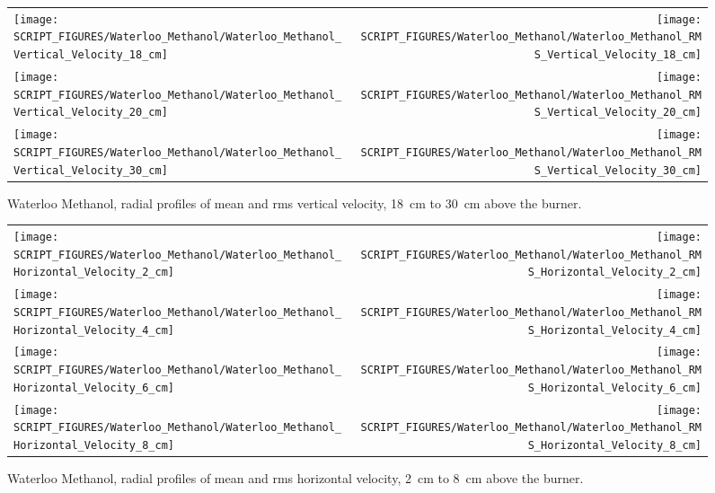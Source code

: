 \begin{figure}[p]
\begin{tabular*}{\textwidth}{l@{\extracolsep{\fill}}r}
\texttt{[image: SCRIPT\_FIGURES/Waterloo\_Methanol/Waterloo\_Methanol\_Vertical\_Velocity\_18\_cm]} &
\texttt{[image: SCRIPT\_FIGURES/Waterloo\_Methanol/Waterloo\_Methanol\_RMS\_Vertical\_Velocity\_18\_cm]} \\
\texttt{[image: SCRIPT\_FIGURES/Waterloo\_Methanol/Waterloo\_Methanol\_Vertical\_Velocity\_20\_cm]} &
\texttt{[image: SCRIPT\_FIGURES/Waterloo\_Methanol/Waterloo\_Methanol\_RMS\_Vertical\_Velocity\_20\_cm]} \\
\texttt{[image: SCRIPT\_FIGURES/Waterloo\_Methanol/Waterloo\_Methanol\_Vertical\_Velocity\_30\_cm]} &
\texttt{[image: SCRIPT\_FIGURES/Waterloo\_Methanol/Waterloo\_Methanol\_RMS\_Vertical\_Velocity\_30\_cm]}
\end{tabular*}
\caption[Waterloo Methanol, radial mean and rms vertical velocity, 18~cm to 30~cm above burner]
{Waterloo Methanol, radial profiles of mean and rms vertical velocity, 18~cm to 30~cm above the burner.}
\label{Water_Methanol_Vert_Vel_3}
\end{figure}


\begin{figure}[p]
\begin{tabular*}{\textwidth}{l@{\extracolsep{\fill}}r}
\texttt{[image: SCRIPT\_FIGURES/Waterloo\_Methanol/Waterloo\_Methanol\_Horizontal\_Velocity\_2\_cm]} &
\texttt{[image: SCRIPT\_FIGURES/Waterloo\_Methanol/Waterloo\_Methanol\_RMS\_Horizontal\_Velocity\_2\_cm]} \\
\texttt{[image: SCRIPT\_FIGURES/Waterloo\_Methanol/Waterloo\_Methanol\_Horizontal\_Velocity\_4\_cm]} &
\texttt{[image: SCRIPT\_FIGURES/Waterloo\_Methanol/Waterloo\_Methanol\_RMS\_Horizontal\_Velocity\_4\_cm]} \\
\texttt{[image: SCRIPT\_FIGURES/Waterloo\_Methanol/Waterloo\_Methanol\_Horizontal\_Velocity\_6\_cm]} &
\texttt{[image: SCRIPT\_FIGURES/Waterloo\_Methanol/Waterloo\_Methanol\_RMS\_Horizontal\_Velocity\_6\_cm]} \\
\texttt{[image: SCRIPT\_FIGURES/Waterloo\_Methanol/Waterloo\_Methanol\_Horizontal\_Velocity\_8\_cm]} &
\texttt{[image: SCRIPT\_FIGURES/Waterloo\_Methanol/Waterloo\_Methanol\_RMS\_Horizontal\_Velocity\_8\_cm]}
\end{tabular*}
\caption[Waterloo Methanol, radial mean and rms horizontal velocity, 2~cm to 8~cm above burner]
{Waterloo Methanol, radial profiles of mean and rms horizontal velocity, 2~cm to 8~cm above the burner.}
\label{Water_Methanol_Hori_Vel_1}
\end{figure}

